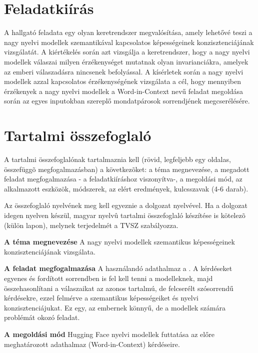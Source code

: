 \documentclass[12pt]{report}
\theoremstyle{definition}
\begin{document}
\chapter*{Feladatkiírás}


A hallgató feladata egy olyan keretrendszer megvalósítása, amely lehetővé teszi a nagy nyelvi modellek szemantikával kapcsolatos képességeinek konzisztenciájának vizsgálatát. A kiértékelés során azt vizsgálja a keretrendszer, hogy a nagy nyelvi modellek válaszai milyen érzékenységet mutatnak olyan invarianciákra, amelyek az emberi válaszadásra nincsenek befolyással. A kísérletek során a nagy nyelvi modellek azzal kapcsolatos érzékenységének vizsgálata a cél, hogy mennyiben érzékenyek a nagy nyelvi modellek a Word-in-Context nevű feladat megoldása során az egyes inputokban szereplő mondatpárosok sorrendjének megcserélésére.

\chapter*{Tartalmi összefoglaló}

A tartalmi összefoglalónak tartalmaznia kell (rövid, legfeljebb egy oldalas, összefüggõ megfogalmazásban)
a következõket: a téma megnevezése, a megadott feladat megfogalmazása - a feladatkiíráshoz viszonyítva-,
a megoldási mód, az alkalmazott eszközök, módszerek, az elért eredmények, kulcsszavak (4-6 darab).

Az összefoglaló nyelvének meg kell egyeznie a dolgozat nyelvével. Ha a dolgozat idegen nyelven készül,
magyar nyelvû tartalmi összefoglaló készítése is kötelezõ (külön lapon), melynek terjedelmét a TVSZ szabályozza.


 \textbf{A téma megnevezése}
    A nagy nyelvi modellek szemantikus
képességeinek konzisztenciájának vizsgálata.

\textbf{A feladat megfogalmazása}
    A használandó adathalmaz a \href{Word-in-Context dataset}{}. A kérdéseket egyenes és fordított sorrendben is fel kell tenni a modelleknek, majd összehasonlítani a válaszaikat az azonos tartalmú, de felcserélt szósorrendű kérdésekre, ezzel felmérve a szemantikus képességeiket és nyelvi konzisztenciájukat. Ez egy, az embernek könnyű, de a modellek számára problémát okozó feladat.

 \textbf{A megoldási mód}
    Hugging Face nyelvi modellek futtatása az előre meghatározott adathalmaz (Word-in-Context) kérdéseire.
\end{document}
